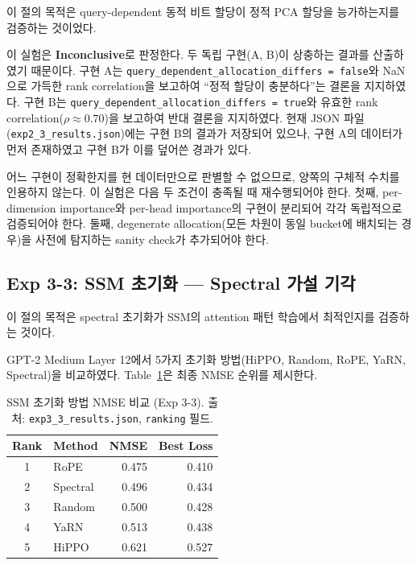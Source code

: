 \documentclass[11pt,a4paper]{article}
\begin{document}
이 절의 목적은 query-dependent 동적 비트 할당이 정적 PCA 할당을 능가하는지를 검증하는 것이었다.

이 실험은 \textbf{Inconclusive}로 판정한다.
두 독립 구현(A, B)이 상충하는 결과를 산출하였기 때문이다.
구현 A는 \texttt{query\_dependent\_allocation\_differs = false}와 NaN으로 가득한 rank correlation을 보고하여 ``정적 할당이 충분하다''는 결론을 지지하였다.
구현 B는 \texttt{query\_dependent\_allocation\_differs = true}와 유효한 rank correlation($\rho \approx 0.70$)을 보고하여 반대 결론을 지지하였다.
현재 JSON 파일(\texttt{exp2\_3\_results.json})에는 구현 B의 결과가 저장되어 있으나, 구현 A의 데이터가 먼저 존재하였고 구현 B가 이를 덮어쓴 경과가 있다.

어느 구현이 정확한지를 현 데이터만으로 판별할 수 없으므로, 양쪽의 구체적 수치를 인용하지 않는다.
이 실험은 다음 두 조건이 충족될 때 재수행되어야 한다.
첫째, per-dimension importance와 per-head importance의 구현이 분리되어 각각 독립적으로 검증되어야 한다.
둘째, degenerate allocation(모든 차원이 동일 bucket에 배치되는 경우)을 사전에 탐지하는 sanity check가 추가되어야 한다.

\subsection{Exp 3-3: SSM 초기화 --- Spectral 가설 기각}
\label{sec:exp33}

이 절의 목적은 spectral 초기화가 SSM의 attention 패턴 학습에서 최적인지를 검증하는 것이다.

GPT-2 Medium Layer 12에서 5가지 초기화 방법(HiPPO, Random, RoPE, YaRN, Spectral)을 비교하였다.
Table~\ref{tab:exp33_main}은 최종 NMSE 순위를 제시한다.

\begin{table}[H]
\centering
\caption{SSM 초기화 방법 NMSE 비교 (Exp 3-3). 출처: \texttt{exp3\_3\_results.json}, \texttt{ranking} 필드.}
\label{tab:exp33_main}
\begin{tabular}{clrr}
\toprule
\textbf{Rank} & \textbf{Method} & \textbf{NMSE} & \textbf{Best Loss} \\
\midrule
1 & RoPE & 0.475 & 0.410 \\
2 & Spectral & 0.496 & 0.434 \\
3 & Random & 0.500 & 0.428 \\
4 & YaRN & 0.513 & 0.438 \\
5 & HiPPO & 0.621 & 0.527 \\
\bottomrule
\end{tabular}
\end{table}
\end{document}
